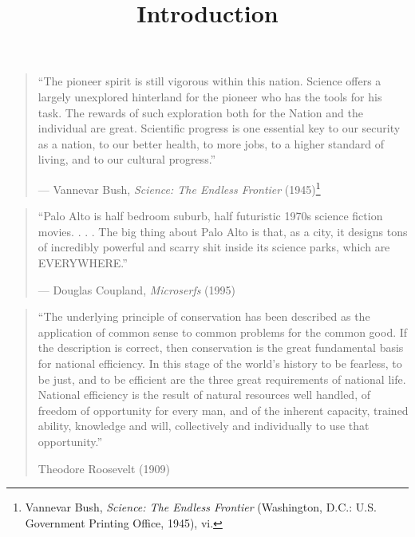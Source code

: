 \documentclass[11pt,article,oneside]{memoir}
\title{\bigskip \bigskip Introduction}
\author{\bigskip\Large }
\begin{document}
  

\setsansfont[Mapping=tex-text, BoldFont={* Bold SemiCondensed}, ItalicFont={* Semibold SemiCondensed Italic}]{Myriad Pro}
\setmonofont[Mapping=tex-text,Scale=MatchLowercase]{Consolas}


\setsansfont[Mapping=tex-text]{Minion Pro} 
\setmonofont[Mapping=tex-text,Scale=0.8]{Consolas}
\pagestyle{kjh}


\maketitle


\begin{quote}
``The pioneer spirit is still vigorous within this nation. Science
offers a largely unexplored hinterland for the pioneer who has the tools
for his task. The rewards of such exploration both for the Nation and
the individual are great. Scientific progress is one essential key to
our security as a nation, to our better health, to more jobs, to a
higher standard of living, and to our cultural progress.''

--- Vannevar Bush, \emph{Science: The Endless Frontier} (1945)\footnote{Vannevar
  Bush, \emph{Science: The Endless Frontier} (Washington, D.C.: U.S.
  Government Printing Office, 1945), vi.}
\end{quote}

\begin{quote}
``Palo Alto is half bedroom suburb, half futuristic 1970s science
fiction movies. . . . The big thing about Palo Alto is that, as a city,
it designs tons of incredibly powerful and scarry shit inside its
science parks, which are EVERYWHERE.''

--- Douglas Coupland, \emph{Microserfs} (1995)
\end{quote}

\begin{quote}
``The underlying principle of conservation has been described as the
application of common sense to common problems for the common good. If
the description is correct, then conservation is the great fundamental
basis for national efficiency. In this stage of the world's history to
be fearless, to be just, and to be efficient are the three great
requirements of national life. National efficiency is the result of
natural resources well handled, of freedom of opportunity for every man,
and of the inherent capacity, trained ability, knowledge and will,
collectively and individually to use that opportunity.''

Theodore Roosevelt (1909)
\end{quote}
\end{document}
